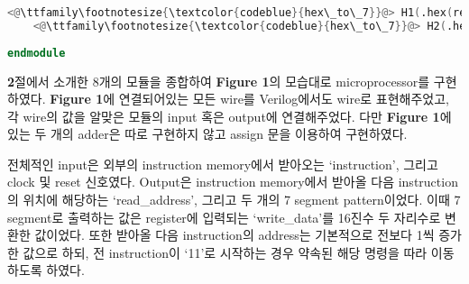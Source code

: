 \documentclass[10pt]{article}
\begin{document}
\begin{lstlisting}[language=Verilog, caption=microprocessor.v]
	<@\ttfamily\footnotesize{\textcolor{codeblue}{hex\_to\_7}}@> H1(.hex(reg_write_data[7:4]), .seg(seg_h));
	<@\ttfamily\footnotesize{\textcolor{codeblue}{hex\_to\_7}}@> H2(.hex(reg_write_data[3:0]), .seg(seg_l));
	 
endmodule
    \end{lstlisting}

    \textbf{2}절에서 소개한 8개의 모듈을 종합하여 \textbf{Figure 1}의 모습대로 microprocessor를 구현하였다.
    \textbf{Figure 1}에 연결되어있는 모든 wire를 Verilog에서도 wire로 표현해주었고, 각 wire의 값을 알맞은 모듈의 input 혹은 output에 연결해주었다.
    다만 \textbf{Figure 1}에 있는 두 개의 adder은 따로 구현하지 않고 assign 문을 이용하여 구현하였다.

    전체적인 input은 외부의 instruction memory에서 받아오는 `instruction', 그리고 clock 및 reset 신호였다.
    Output은 instruction memory에서 받아올 다음 instruction의 위치에 해당하는 `read\_address', 그리고 두 개의 7 segment pattern이었다. 
    이때 7 segment로 출력하는 값은 register에 입력되는 `write\_data'를 16진수 두 자리수로 변환한 값이었다.
    또한 받아올 다음 instruction의 address는 기본적으로 전보다 1씩 증가한 값으로 하되, 전 instruction이 `11'로 시작하는 경우 약속된 해당 명령을 따라 이동하도록 하였다.
\end{document}
